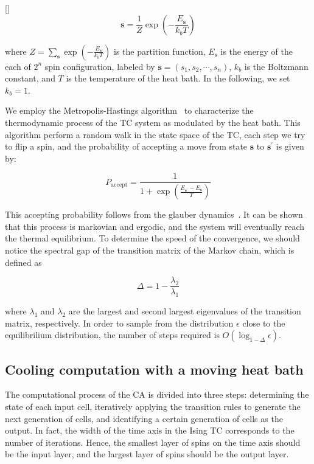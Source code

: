 \documentclass[twocolumn,superscriptaddress,english,showpacs,longbibliography]{revtex4-2}
\newcommand{\jinguo}[1]{[{\color{blue}{JGL: #1}}]}
\begin{document}
\jinguo{please do not use the ket bra notation}
\begin{equation}
    \mathbf{s} = \frac{1}{Z}\exp\left(- \frac{E_{\mathbf{s}}}{k_bT}\right)
\end{equation}

where $Z = \sum_{\mathbf{s}} \exp\left(-\frac{E_{\mathbf{s}}}{k_bT}\right)$ is the partition function, 
$E_{\mathbf{s}}$ is the energy of the each of $2^n$ spin configuration, labeled by $\mathbf{s} = (s_1, s_2, \cdots, s_n)$, $k_b$ is the Boltzmann constant, and $T$ is the temperature of the heat bath. 
In the following, we set $k_b = 1$.

We employ the Metropolis-Hastings algorithm~\cite{metropolis1953equation} to characterize the thermodynamic process of the TC system as modulated by the heat bath.
This algorithm perform a random walk in the state space of the TC, each step we try to flip a spin,
and the probability of accepting a move from state $\mathbf{s}$ to $\mathbf{s}^\prime$ is given by:

\begin{equation}
    P_{\text{accept}} = \frac{1}{1+\exp\left(\frac{E_{\mathbf{s}^\prime} - E_{\mathbf{s}}}{T}\right)}
\end{equation}

This accepting probability follows from the glauber dynamics~\cite{glauber1963time}.
It can be shown that this process is markovian and ergodic, and the system will eventually reach the thermal equilibrium.
To determine the speed of the convergence, we should notice the spectral gap of the transition matrix of the Markov chain, which is defined as

\begin{equation}
    \Delta = 1 - \frac{\lambda_2}{\lambda_1}
\end{equation}

where $\lambda_1$ and $\lambda_2$ are the largest and second largest eigenvalues of the transition matrix, respectively.
In order to sample from the distribution $\epsilon$ close to the equilibrilium distribution, the number of steps required is $O(\log_{1-\Delta} \epsilon)$.

\subsection{Cooling computation with a moving heat bath}\label{cooling-computation-with-moving-heat-bath}

The computational process of the CA is divided into three steps: determining the state of each input cell, iteratively applying the transition rules to generate the next generation of cells, and identifying a certain generation of cells as the output. In fact, the width of the time axis in the Ising TC corresponds to the number of iterations. Hence, the smallest layer of spins on the time axis should be the input layer, and the largest layer of spins should be the output layer. 
\end{document}

